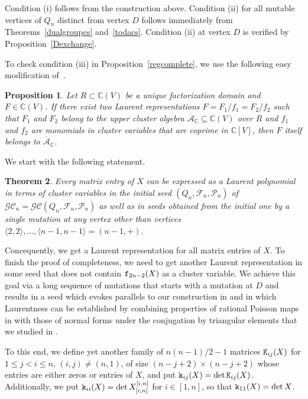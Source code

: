 \documentclass{amsart}
\newtheorem{theorem}{Theorem}
\newtheorem{proposition}[theorem]{Proposition}
\theoremstyle{definition}
\theoremstyle{remark}
\numberwithin{equation}{section}
\numberwithin{theorem}{section}
\def\A{{\mathcal A}}
\def\C{{\mathbb C}}
\def\CC{{\mathcal C}}
\def\FF{{\mathcal F}}
\def\G{{\mathcal G}}
\def\NK{{\tt K}}
\def\PP{{\mathcal P}}
\def\UC{\overline{\A}}
\def\ef{{\tt f}}
\def\ek{{\tt k}}
\begin{document}
Condition (i) follows from the construction above. Condition (ii) for all mutable vertices of $Q_n$ distinct from vertex $D$ follows immediately from Theorems~\ref{dualgroupcs} and~\ref{todacs}. Condition (ii) at vertex $D$ is
verified by Proposition~\ref{Dexchange}. 

To check condition (iii) in Proposition~\ref{regcomplete}, we use the following easy modification
of~\cite[Lemma 8.3]{GSVMem}.

\begin{proposition}\label{twolaurent} Let $R\subset \C(V)$ be a unique factorization domain and $F\in\C(V)$.
If there exist two Laurent representations $F=F_1/f_1=F_2/f_2$ such that $F_1$ and $F_2$ belong to the upper cluster algebra $\UC_\C \subseteq \C(V)$ over $R$ and $f_1$ and $f_2$ are monomials in cluster variables that are coprime in $\C[V]$, 
then $F$ itself belongs to $\UC_\C$.
\end{proposition}

We start with the following statement. 

\begin{theorem}
\label{thm:InitLaurent}
Every matrix entry of $X$ can be expressed as a Laurent polynomial in terms of cluster variables in the initial seed 
$(Q_n,\FF_n,\PP_n)$ of $\G\CC_n=\G\CC(Q_n,\FF_n,\PP_n)$ as well as in seeds obtained from the initial one by a single mutation at any vertex other than vertices $\langle 2, 2\rangle,\ldots, \langle n-1,n-1\rangle = (n-1, +)$.
\end{theorem}

Concequently, we get a Laurent representation for all matrix entries of $X$.   
To finish the proof of completeness, we need to get another Laurent representation in some seed that does not contain 
$\ef_{2n-2}(X)$ as a  cluster variable. We achieve this goal via a long sequence of mutations that starts with a mutation at $D$ and results in a seed which evokes parallels to our construction in \cite{GSVuni} and in which  Laurentness can be established by combining properties of rational Poisson maps  in \cite{GSVuni} with
those of normal forms under the conjugation by triangular elements that we studied  in \cite{GSVdouble}.

To this end, we define yet another family of $n(n-1)/2-1$ matrices $\NK_{ij}(X)$ for $1\le j<i\le n$, 
$(i,j)\ne(n,1)$, of size $(n-j+2)\times(n-j+2)$ whose entries are either zeros or entries of $X$, and put
$\ek_{ij}(X)=\det \NK_{ij}(X)$. Additionally, we put $\ek_{ii}(X)=\det X_{[i,n]}^{[i,n]}$ for $i\in [1,n]$, so that
$\ek_{11}(X)=\det X$.
\end{document}
